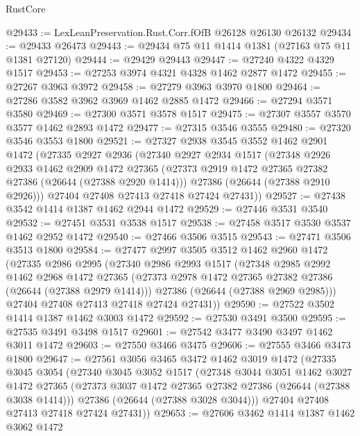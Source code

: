 \begin{lexlean}{RustCore}
\begin{coremodule}
@29433 := LexLeanPreservation.Rust.Corr.fOfB @26128 @26130 @26132
@29434 := @29433 @26473
@29443 := @29434 @75 @11 @1414 @1381 (@27163 @75 @11 @1381 @27120)
@29444 := @29429 @29443
@29447 := @27240 @4322 @4329 @1517
@29453 := @27253 @3974 @4321 @4328 @1462 @2877 @1472
@29455 := @27267 @3963 @3972
@29458 := @27279 @3963 @3970 @1800
@29464 := @27286 @3582 @3962 @3969 @1462 @2885 @1472
@29466 := @27294 @3571 @3580
@29469 := @27300 @3571 @3578 @1517
@29475 := @27307 @3557 @3570 @3577 @1462 @2893 @1472
@29477 := @27315 @3546 @3555
@29480 := @27320 @3546 @3553 @1800
@29521 := @27327
    @2938
    @3545
    @3552
    @1462
    @2901
    @1472
    (@27335
      @2927
      @2936
      (@27340
        @2927
        @2934
        @1517
        (@27348
          @2926
          @2933
          @1462
          @2909
          @1472
          @27365
          (@27373 @2919 @1472 @27365 @27382 @27386 (@26644 (@27388 @2920 @1414)))
          @27386
          (@26644 (@27388 @2910 @2926)))
        @27404
        @27408
        @27413
        @27418
        @27424
        @27431))
@29527 := @27438 @3542 @1414 @1387 @1462 @2944 @1472
@29529 := @27446 @3531 @3540
@29532 := @27451 @3531 @3538 @1517
@29538 := @27458 @3517 @3530 @3537 @1462 @2952 @1472
@29540 := @27466 @3506 @3515
@29543 := @27471 @3506 @3513 @1800
@29584 := @27477
    @2997
    @3505
    @3512
    @1462
    @2960
    @1472
    (@27335
      @2986
      @2995
      (@27340
        @2986
        @2993
        @1517
        (@27348
          @2985
          @2992
          @1462
          @2968
          @1472
          @27365
          (@27373 @2978 @1472 @27365 @27382 @27386 (@26644 (@27388 @2979 @1414)))
          @27386
          (@26644 (@27388 @2969 @2985)))
        @27404
        @27408
        @27413
        @27418
        @27424
        @27431))
@29590 := @27522 @3502 @1414 @1387 @1462 @3003 @1472
@29592 := @27530 @3491 @3500
@29595 := @27535 @3491 @3498 @1517
@29601 := @27542 @3477 @3490 @3497 @1462 @3011 @1472
@29603 := @27550 @3466 @3475
@29606 := @27555 @3466 @3473 @1800
@29647 := @27561
    @3056
    @3465
    @3472
    @1462
    @3019
    @1472
    (@27335
      @3045
      @3054
      (@27340
        @3045
        @3052
        @1517
        (@27348
          @3044
          @3051
          @1462
          @3027
          @1472
          @27365
          (@27373 @3037 @1472 @27365 @27382 @27386 (@26644 (@27388 @3038 @1414)))
          @27386
          (@26644 (@27388 @3028 @3044)))
        @27404
        @27408
        @27413
        @27418
        @27424
        @27431))
@29653 := @27606 @3462 @1414 @1387 @1462 @3062 @1472

\end{coremodule}
\end{lexlean}

